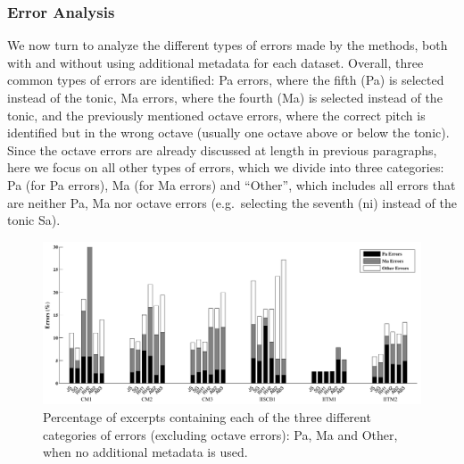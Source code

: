{\subsubsection{Error Analysis}
\label{sec:pre_processing_tonic_identification_error_analysis}

We now turn to analyze the different types of errors made by the methods, both with and without using additional metadata for each dataset. Overall, three common types of errors are identified: Pa errors, where the fifth (Pa) is selected instead of the tonic, Ma errors, where the fourth (Ma) is selected instead of the tonic, and the previously mentioned octave errors, where the correct pitch is identified but in the wrong octave (usually one octave above or below the
tonic). Since the octave errors are already discussed at length in previous paragraphs, here we focus on all other types of errors, which we divide into three categories: Pa (for Pa errors), Ma (for Ma errors) and ``Other'', which includes all errors that are neither Pa, Ma nor octave errors (e.g.~selecting the seventh (\acrshort{ni}) instead of the tonic Sa).


\begin{figure}
	\begin{center}
		\includegraphics[width=\figSizeHundred]{ch05_preprocessing/figures/ErrorAnalysis_Without_MF.pdf}
	\end{center}
	\caption{Percentage of excerpts containing each of the three different
		categories of errors (excluding octave errors): Pa, Ma and Other, when no additional metadata is used.}
	\label{fig:tonic_identification_errors_without_MF}
\end{figure}

}
